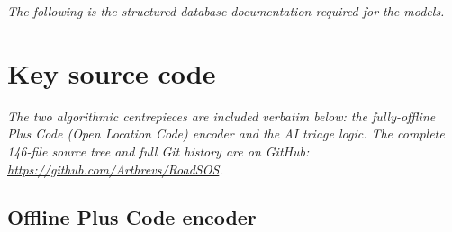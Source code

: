 \documentclass[11pt, a4paper]{article}
\begin{document}
\textit{The following is the structured database documentation required for the models.}



\section{Key source code}

\textit{The two algorithmic centrepieces are included verbatim below: the
fully-offline Plus Code (Open Location Code) encoder and the AI triage logic.
The complete 146-file source tree and full Git history are on GitHub:
\url{https://github.com/Arthrevs/RoadSOS}.}

\subsection{Offline Plus Code encoder}
\end{document}

